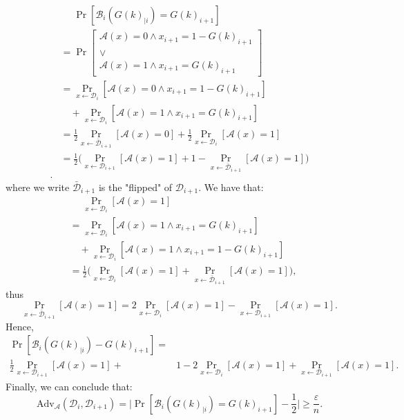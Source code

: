 \documentclass[./main]{subfiles}
\begin{document}
\begin{prv}
\begin{align*}
      &\phantom{={}}\Pr[\mathcal{B}_i(G(k)_{|i}) = G(k)_{i+1}]\\
      &= \Pr \left[
        \begin{array}{c}
          \mathcal{A}(x) = 0 \land x_{i+1} = 1 - G(k)_{i+1}\\
          \lor\\
          \mathcal{A}(x) = 1 \land x_{i+1} = G(k)_{i+1}
        \end{array}
      \right] \\
      &= \Pr_{x \gets \mathcal{D}_i} [\mathcal{A}(x) = 0 \land x_{i+1} = 1 - G(k)_{i+1}]\\
      &\quad + \Pr_{x\gets \mathcal{D}_i}[\mathcal{A}(x) = 1 \land x_{i+1} = G(k)_{i+1}]\\
      &=
      \frac{1}{2} \Pr_{x \gets \bar{\mathcal{D}}_{i+1}}[\mathcal{A}(x) = 0]
      + \frac{1}{2} \Pr_{x \gets \mathcal{D}_{i}}[\mathcal{A}(x) = 1]\\
      &= \frac{1}{2}\big(
        \Pr_{x \gets \mathcal{D}_{i+1}}[\mathcal{A}(x) = 1]
        + 1 - \Pr_{x \gets \bar{\mathcal{D}}_{i+1}}[\mathcal{A}(x) = 1]
      \big) \\
    .\end{align*}
    where we write $\bar{\mathcal{D}}_{i+1}$ is the "flipped" of $\mathcal{D}_{i+1}$.
    We have that:
    \begin{align*}
      &\phantom{={}}\Pr_{x \gets \mathcal{D}_i}[\mathcal{A}(x) = 1]\\
      &= \Pr_{x \gets \mathcal{D}_i}[\mathcal{A}(x) = 1 \land x_{i+1} = G(k)_{i+1}] \\
      &\quad+ \Pr_{x \gets \mathcal{D}_i}[\mathcal{A}(x) = 1 \land x_{i+1} = 1 - G(k)_{i+1}] \\
      &= \frac{1}{2}\big(\Pr_{x \gets \mathcal{D}_i}[\mathcal{A}(x) = 1] + \Pr_{x \gets \bar{\mathcal{D}}_{i+1}}[\mathcal{A}(x) = 1]\big)
    ,\end{align*}
    thus
    \[
      \Pr_{x \gets \bar{\mathcal{D}}_{i+1}}[\mathcal{A}(x) = 1] = 2 \Pr_{x \gets \mathcal{D}_i}[\mathcal{A}(x) = 1] - \Pr_{x \gets \mathcal{D}_{i+1}}[\mathcal{A}(x) = 1]
    .\]
    Hence, 
    \begin{align*}
      \Pr[\mathcal{B}_i(G(k)_{|i}) - G(k)_{i+1}] =& \\
      \frac{1}{2}\Pr_{x \gets \mathcal{D}_{i+1}}[\mathcal{A}(x) = 1] +{} &1 - 2 \Pr_{x \gets \mathcal{D}_i}[\mathcal{A}(x) = 1] + \Pr_{x \gets \mathcal{D}_{i+1}}[\mathcal{A}(x) = 1]
    .\end{align*}
    Finally, we can conclude that:
    \[
      \mathrm{Adv}_\mathcal{A}(\mathcal{D}_i, \mathcal{D}_{i+1}) = \Big|\Pr[\mathcal{B}_i(G(k)_{|i}) = G(k)_{i+1}] - \frac{1}{2}\Big| \ge \frac{\varepsilon}{n}
    .\] 
  \end{prv}
\end{document}
